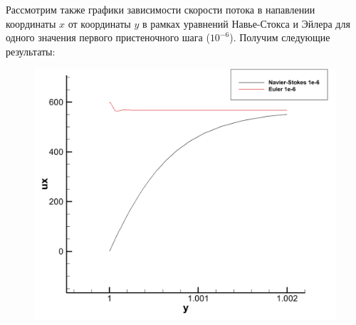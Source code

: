 \documentclass[12pt,a4paper, titlepage]{article}
\begin{document}
Рассмотрим также графики зависимости скорости потока в напавлении координаты $x$ от координаты $y$ в рамках уравнений Навье-Стокса и Эйлера для одного значения первого пристеночного шага ($10^{-6}$). Получим следующие результаты:
\begin{figure}[H]
	\centering
	\includegraphics[width = 1.0\textwidth]{ans_2_add.png}
\end{figure}
\end{document}
